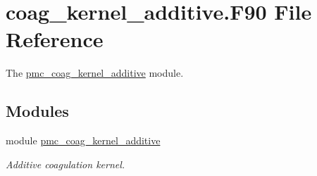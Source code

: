 \hypertarget{coag__kernel__additive_8_f90}{}\section{coag\+\_\+kernel\+\_\+additive.\+F90 File Reference}
\label{coag__kernel__additive_8_f90}


The \mbox{\hyperlink{namespacepmc__coag__kernel__additive}{pmc\+\_\+coag\+\_\+kernel\+\_\+additive}} module.  


\subsection*{Modules}
\begin{DoxyCompactItemize}
\item 
module \mbox{\hyperlink{namespacepmc__coag__kernel__additive}{pmc\+\_\+coag\+\_\+kernel\+\_\+additive}}
\begin{DoxyCompactList}\small\item\em Additive coagulation kernel. \end{DoxyCompactList}\end{DoxyCompactItemize}
